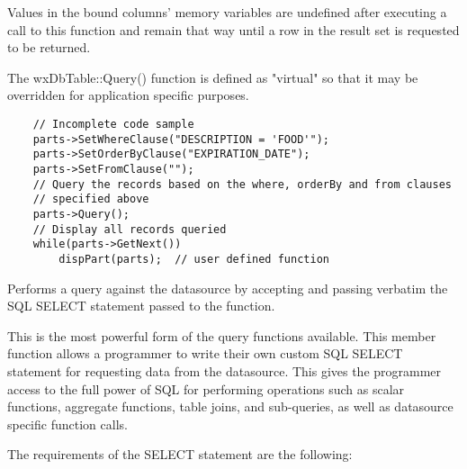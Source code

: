 Values in the bound columns' memory variables are undefined after executing a
call to this function and remain that way until a row in the result set is
requested to be returned.

The wxDbTable::Query() function is defined as "virtual" so that it may be
overridden for application specific purposes.



\begin{verbatim}
    // Incomplete code sample
    parts->SetWhereClause("DESCRIPTION = 'FOOD'");
    parts->SetOrderByClause("EXPIRATION_DATE");
    parts->SetFromClause("");
    // Query the records based on the where, orderBy and from clauses
    // specified above
    parts->Query();
    // Display all records queried
    while(parts->GetNext())
        dispPart(parts);  // user defined function
\end{verbatim}

\label{wxdbtablequerybysqlstmt}


Performs a query against the datasource by accepting and passing verbatim the
SQL SELECT statement passed to the function.




This is the most powerful form of the query functions available.  This member
function allows a programmer to write their own custom SQL SELECT statement
for requesting data from the datasource.  This gives the programmer access
to the full power of SQL for performing operations such as scalar functions,
aggregate functions, table joins, and sub-queries, as well as datasource
specific function calls.

The requirements of the SELECT statement are the following:

